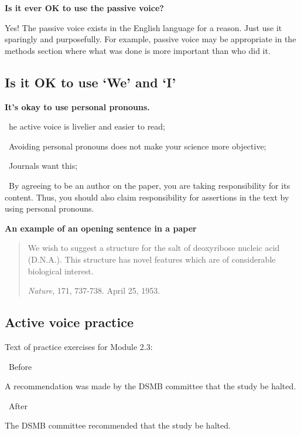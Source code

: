 \documentclass[a4paper, 12pt]{article}
\begin{document}
\par\textbf{Is it ever OK to use the passive voice?}
\par Yes! The passive voice exists in the English language for a reason. Just use it sparingly and purposefully. For example, passive voice may be appropriate in the methods section where what was done is more important than who did it.

\newpage\subsection{Is it OK to use `We' and `I'}

\par\textbf{It's okay to use personal pronouns.}
\par\textbullet\ he active voice is livelier and easier to read;
\par\textbullet\  Avoiding personal pronouns does not make your science more objective;
\par\textbullet\ Journals want this;
\par\textbullet\ By agreeing to be an author on the paper, you are taking responsibility for its content. Thus, you should also claim responsibility for assertions in the text by using personal pronouns.


\par\textbf{An example of an opening sentence in a paper}

\vspace{4pt}\begin{quote}
We wish to suggest a structure for the salt of deoxyribose nucleic acid (D.N.A.). This structure has novel features which are of considerable biological interest.
\begin{flushright}
\textit{Nature}, 171, 737-738. April 25, 1953.
\end{flushright}
\end{quote}

\subsection{Active voice practice}

Text of practice exercises for Module 2.3:

\par\textbullet\ Before
\par A recommendation was made by the DSMB committee that the study be halted.

\par\textbullet\ After
\par The DSMB committee recommended that the study be halted.
\end{document}
